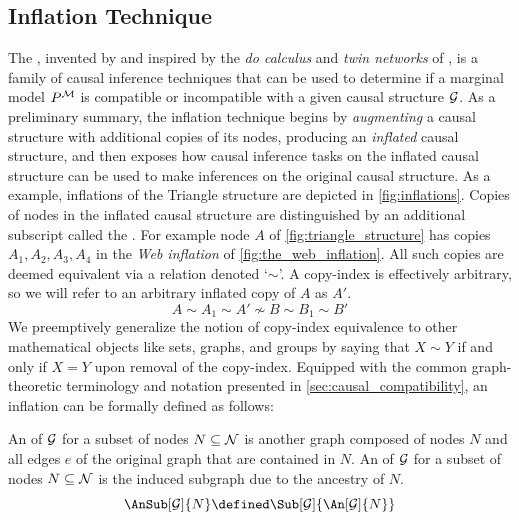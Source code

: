 \documentclass[aps, 10pt, english, twoside, pra, nofootinbib, tightenlines, longbibliography, superscriptaddress]{revtex4-1}
\begin{document}
    \subsection{Inflation Technique}
    \label{sec:deriving_inequalities}
    \label{sec:inflation_technique_main_summary}
    The , invented by \citet{Inflation} and inspired by the \textit{do calculus} and \textit{twin networks} of \citet{Pearl_2009}, is a family of causal inference techniques that can be used to determine if a marginal model $\prob^{\mscenario}$ is compatible or incompatible with a given causal structure $\mathcal{G}$. As a preliminary summary, the inflation technique begins by \textit{augmenting} a causal structure with additional copies of its nodes, producing an \textit{inflated} causal structure, and then exposes how causal inference tasks on the inflated causal structure can be used to make inferences on the original causal structure. As a example, inflations of the Triangle structure are depicted in \cref{fig:inflations}. Copies of nodes in the inflated causal structure are distinguished by an additional subscript called the . For example node $A$ of \cref{fig:triangle_structure} has copies $A_1, A_2, A_3, A_4$ in the \textit{Web inflation} of \cref{fig:the_web_inflation}. All such copies are deemed equivalent via a  relation denoted `$\sim$'. A copy-index is effectively arbitrary, so we will refer to an arbitrary inflated copy of $A$ as $A'$.
    \[ A \sim A_1 \sim A' \not\sim B \sim B_1 \sim B' \]
    We preemptively generalize the notion of copy-index equivalence to other mathematical objects like sets, graphs, and groups by saying that $X \sim Y$ if and only if $X = Y$ upon removal of the copy-index. Equipped with the common graph-theoretic terminology and notation presented in \cref{sec:causal_compatibility}, an inflation can be formally defined as follows:

    \begin{definition}
        An  of $\mathcal{G}$ for a subset of nodes $N \subseteq \mathcal{N}$ is another graph composed of nodes $N$ and all edges $e$ of the original graph that are contained in $N$.
        An  of $\mathcal{G}$ for a subset of nodes $N \subseteq \mathcal{N}$ is the induced subgraph due to the ancestry of $N$.
        \[ \AnSub[\graph]{N} \defined \Sub[\graph]{\An[\graph]{N}} \]
    \end{definition}
\end{document}

